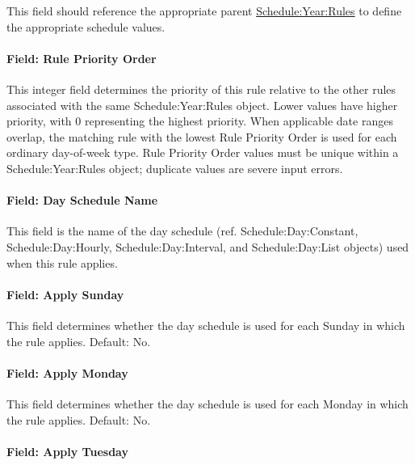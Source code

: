 This field should reference the appropriate parent \hyperref[scheduleyearrules]{Schedule:Year:Rules} to define the appropriate schedule values.

\paragraph{Field: Rule Priority Order}\label{field-rule-priority-order-scheduleweekrule}

This integer field determines the priority of this rule relative to the other rules associated with the same Schedule:Year:Rules object.
Lower values have higher priority, with 0 representing the highest priority.
When applicable date ranges overlap, the matching rule with the lowest Rule Priority Order is used for each ordinary day-of-week type.
Rule Priority Order values must be unique within a Schedule:Year:Rules object; duplicate values are severe input errors.

\paragraph{Field: Day Schedule Name}\label{field-day-schedule-name-scheduleweekrule}

This field is the name of the day schedule (ref. Schedule:Day:Constant, Schedule:Day:Hourly, Schedule:Day:Interval, and Schedule:Day:List objects) used when this rule applies.

\paragraph{Field: Apply Sunday}\label{field-apply-sunday-scheduleweekrule}

This field determines whether the day schedule is used for each Sunday in which the rule applies.
Default: No.

\paragraph{Field: Apply Monday}\label{field-apply-monday-scheduleweekrule}

This field determines whether the day schedule is used for each Monday in which the rule applies.
Default: No.

\paragraph{Field: Apply Tuesday}\label{field-apply-tuesday-scheduleweekrule}

